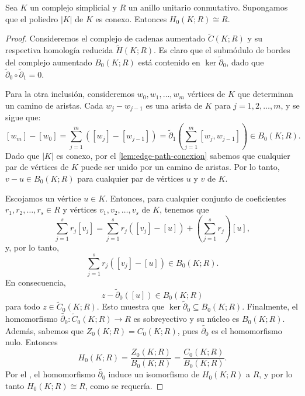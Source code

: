\begin{teorema}
	\label{teo:comp-conex-iso-R} Sea $K$ un complejo simplicial y $R$ un anillo unitario
	conmutativo. Supongamos que el poliedro $|K|$ de $K$ es conexo. Entonces $H_{0}
	(K; R) \cong R$.
\end{teorema}
\begin{proof}
	Consideremos el complejo de cadenas aumentado $\widetilde{C}(K; R)$ y su respectiva
	homología reducida $\widetilde{H}(K; R)$. Es claro que el submódulo de bordes
	del complejo aumentado $B_{0}(K; R)$ está contenido en
	$\ker \widetilde{\partial}_{0}$, dado que $\widetilde{\partial}_{0} \circ \widetilde
	{\partial}_{1} = 0$.
	
	Para la otra inclusión, consideremos $w_{0}, w_{1}, \ldots, w_{m}$ vértices de
	$K$ que determinan un camino de aristas. Cada $w_{j} - w_{j-1}$ es una arista de
	$K$ para $j = 1, 2, \ldots, m$, y se sigue que:
	\[
	[w_{m}] - [w_{0}] = \sum_{j=1}^{m} ([w_{j}] - [w_{j-1}]) = \widetilde{\partial}
	_{1} \left( \sum_{j=1}^{m} [w_{j}, w_{j-1}] \right) \in B_{0}(K; R).
	\]
	Dado que $|K|$ es conexo, por el \autoref{lem:edge-path-conexion} sabemos que
	cualquier par de vértices de $K$ puede ser unido por un camino de aristas. Por
	lo tanto, $v - u \in B_{0}(K; R)$ para cualquier par de vértices $u$ y $v$ de
	$K$.
	
	Escojamos un vértice $u \in K$. Entonces, para cualquier conjunto de
	coeficientes $r_{1}, r_{2}, \ldots, r_{s} \in R$ y vértices
	$v_{1}, v_{2}, \ldots, v_{s}$ de $K$, tenemos que
	\[
	\sum_{j=1}^{s} r_{j}[v_{j}] = \sum_{j=1}^{s} r_{j}([v_{j}] - [u]) + \left( \sum
	_{j=1}^{s} r_{j} \right) [u],
	\]
	y, por lo tanto,
	\[
	\sum_{j=1}^{s} r_{j}([v_{j}] - [u]) \in B_{0}(K; R).
	\]
	En consecuencia,
	\[
	z - \widetilde{\partial}_{0}([u]) \in B_{0}(K; R)
	\]
	para todo $z \in \widetilde{C}_{0}(K; R)$. Esto muestra que $\ker \widetilde{\partial}
	_{0} \subseteq B_{0}(K; R)$. Finalmente, el homomorfismo $\widetilde{\partial_0}
	: \widetilde{C}_{0}(K; R) \rightarrow R$ es sobreyectivo y su núcleo es $B_{0}(
	K; R)$. Además, sabemos que $Z_{0}(K; R) = C_{0}(K; R)$, pues
	$\widetilde{\partial_0}$ es el homomorfismo nulo. Entonces
	\[
	H_{0}(K; R) =\frac{ Z_{0}(K; R)}{B_{0}(K; R)}= \frac{C_{0}(K; R)}{B_{0}(K; R)}
	.
	\]
	Por el , el homomorfismo $\widetilde{\partial_0}$ induce
	un isomorfismo de $H_{0}(K; R)$ a $R$, y por lo tanto $H_{0}(K; R) \cong R$, como
	se requería.
\end{proof}

